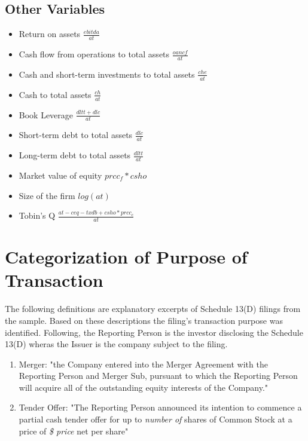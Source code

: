 \documentclass[12pt]{article}
\begin{document}
\begin{appendices}
	\subsection*{Other Variables}

	\begin{itemize}
	\renewcommand\labelitemi{--}
		\item Return on assets $\frac{ebitda}{at}$
		\item Cash flow from operations to total assets $\frac{oancf}{at}$
		\item Cash and short-term investments to total assets $\frac{che}{at}$
		\item Cash to total assets $\frac{ch}{at}$
		\item Book Leverage \citep[p.1440]{MacKay2005} $\frac{dltt+dlc}{at}$
		\item Short-term debt to total assets $\frac{dlc}{at}$ 
		\item Long-term debt to total assets $\frac{dltt}{at}$
		\item Market value of equity $prcc_f*csho$
		\item Size of the firm $log(at)$
		\item Tobin's Q \citep[p.120]{Khatami2014} $\frac{at-ceq-txdb+csho*prcc_c}{at}$
	\end{itemize}


\section{Categorization of Purpose of Transaction}

\noindent The following definitions are explanatory excerpts of Schedule 13(D) filings from the sample. Based on these descriptions the filing's transaction purpose was identified. Following, the Reporting Person is the investor disclosing the Schedule 13(D) wheras the Issuer is the company subject to the filing. 
\begin{enumerate}
	

\item Merger: "the Company entered into the Merger Agreement with the Reporting Person and Merger Sub, pursuant to which the Reporting Person will acquire all of the outstanding equity interests of the Company."

\item Tender Offer: "The Reporting Person announced its intention to commence a partial cash tender offer for up to \emph{number of} shares of Common Stock at a price of \emph{\$ price} net per share"


\end{enumerate}
\end{appendices}
\end{document}
